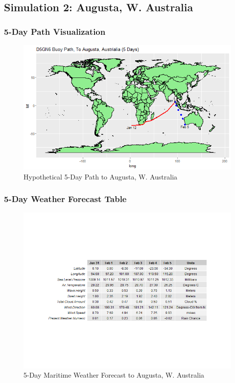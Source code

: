 \documentclass{article}
\begin{document}
\subsection{Simulation 2: Augusta, W. Australia}

\subsubsection*{5-Day Path Visualization}

\begin{figure}[h]
    \centering
    \includegraphics[scale = 0.4]{volume/augustaPath.png}
    \caption{Hypothetical 5-Day Path to Augusta, W. Australia}
    \label{fig:augustaPath}
\end{figure}

\newpage

\subsubsection*{5-Day Weather Forecast Table}

\begin{figure}[h]
    \centering
    \includegraphics[scale = 0.35]{volume/augustaForecastData.png}
    \caption{5-Day Maritime Weather Forecast to Augusta, W. Australia}
    \label{fig:augustaData}
\end{figure}
\end{document}
